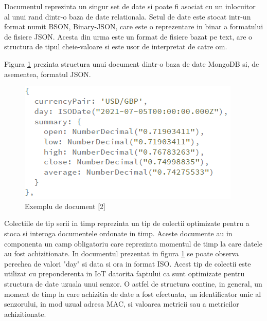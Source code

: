 Documentul reprezinta un singur set de date si poate fi asociat cu un inlocuitor al unui rand dintr-o baza de date relationala. Setul de date este stocat intr-un 
format numit BSON, Binary-JSON, care este o reprezentare in binar a formatului de fisiere JSON. Acesta din urma este un format de fisiere bazat pe text,
are o structura de tipul cheie-valoare si este usor de interpretat de catre om.

Figura \ref{fig:MongoDBDocument} prezinta structura unui document dintr-o baza de date MongoDB si, de asementea, formatul JSON.
\begin{figure}[H]
    \centering
    \includegraphics[scale=0.8]{figs/mongoDBDocument.png}
    \caption{Exemplu de document [2]}
    \label{fig:MongoDBDocument}
\end{figure}

Colectiile de tip serii in timp reprezinta un tip de colectii optimizate pentru a stoca si interoga documentele ordonate in timp. Aceste documente au in 
componenta un camp obligatoriu care reprezinta momentul de timp la care datele au fost achizitionate. In documentul prezentat in figura \ref{fig:MongoDBDocument} 
se poate observa perechea de valori "day" si data si ora in format ISO. Acest tip de colectii este utilizat cu preponderenta in IoT datorita faptului ca sunt 
optimizate pentru structura de date uzuala unui senzor. O astfel de structura contine, in general, un moment de timp la care achizitia de date a fost efectuata, 
un identificator unic al senzorului, in mod uzual adresa MAC, si valoarea metricii sau a metricilor achizitionate.

